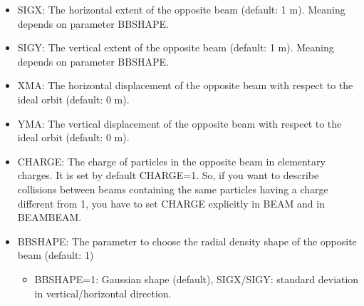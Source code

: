 \begin{itemize}
	\item SIGX:
 The horizontal extent of the opposite beam (default: 1 m).
 Meaning depends on parameter BBSHAPE.
 
	\item SIGY:
 The vertical extent of the opposite beam (default: 1 m).
 Meaning depends on parameter BBSHAPE.
 
	\item XMA:
 The horizontal displacement of the opposite beam with respect to
 the ideal orbit (default: 0 m).
 
	\item YMA:
 The vertical displacement of the opposite beam with respect to
 the ideal orbit (default: 0 m).
 
	\item CHARGE:
 The charge of particles in the opposite beam in elementary charges. 
 It is set by default CHARGE=1. So, if you want to describe collisions 
 between beams containing the same particles having a charge different 
 from 1, you have to set CHARGE explicitly in BEAM and 
 in BEAMBEAM. 
 
	\item BBSHAPE: The parameter to choose the radial density shape of the 
 opposite beam (default: 1)
 
\begin{itemize}
	\item  BBSHAPE=1: Gaussian shape (default), SIGX/SIGY: standard deviation in 
 vertical/horizontal direction.
 

\end{itemize}
\end{itemize}
